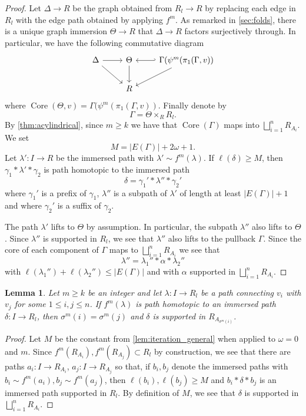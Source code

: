 \documentclass[11pt, a4paper]{amsart}
\newtheorem{lemma}[theorem]{Lemma}
\theoremstyle{definition}
\DeclareMathOperator{\len}{\ell}
\DeclareMathOperator{\core}{Core}
\begin{document}
\begin{proof}
Let $\Delta\to R$ be the graph obtained from $R_l\to R$ by replacing each edge in $R_l$ with the edge path obtained by applying $f^m$. As remarked in \cref{sec:folds}, there is a unique graph immersion $\Theta\to R$ that $\Delta\to R$ factors surjectively through. In particular, we have the following commutative diagram
\[
\begin{tikzcd}
\Delta \arrow[rd] \arrow[r] & \Theta \arrow[d] & {\Gamma(\psi^m(\pi_1(\Gamma, v))} \arrow[l, hook'] \arrow[ld] \\
                            & R                &                                                              
\end{tikzcd}
\]
where $\core(\Theta, v) = \Gamma(\psi^m(\pi_1(\Gamma, v))$. Finally denote by 
\[
\Gamma = \Theta\times_RR_{l}.
\]
By \cref{thm:acylindrical}, since $m\geqslant k$ we have that $\core(\Gamma)$ maps into $\bigsqcup_{i=1}^nR_{A_i}$. We set
\[
M = |E(\Gamma)| + 2\omega + 1.
\]
Let $\lambda'\colon I\to R$ be the immersed path with $\lambda'\sim f^m(\lambda)$. If $\len(\delta)\geqslant M$, then $\gamma_1*\lambda'*\gamma_2$ is path homotopic to the immersed path
\[
\delta = \gamma_1'*\lambda''*\gamma_2'
\]
where $\gamma_1'$ is a prefix of $\gamma_1$, $\lambda''$ is a subpath of $\lambda'$ of length at least $|E(\Gamma)|+1$ and where $\gamma_2'$ is a suffix of $\gamma_2$.

The path $\lambda'$ lifts to $\Theta$ by assumption. In particular, the subpath $\lambda''$ also lifts to $\Theta$. Since $\lambda''$ is supported in $R_{l}$, we see that $\lambda''$ also lifts to the pullback $\Gamma$. Since the core of each component of $\Gamma$ maps to $\bigsqcup_{i=1}^nR_{A_i}$ we see that 
\[
\lambda'' = \lambda_1''*\alpha*\lambda_2''
\]
with $\len(\lambda_1'') + \len(\lambda_2'') \leqslant |E(\Gamma)|$ and with $\alpha$ supported in $\bigsqcup_{i=1}^nR_{A_i}$.
\end{proof}


\begin{lemma}
\label{lem:iteration}
Let $m\geqslant k$ be an integer and let $\lambda\colon I\to R_l$ be a path connecting $v_i$ with $v_j$ for some $1\leqslant i, j\leqslant n$. If $f^m(\lambda)$ is path homotopic to an immersed path $\delta\colon I \to R_l$, then $\sigma^m(i) = \sigma^m(j)$ and $\delta$ is supported in $R_{A_{\sigma^m(i)}}$. 
\end{lemma}

\begin{proof}
Let $M$ be the constant from \cref{lem:iteration_general} when applied to $\omega = 0$ and $m$. Since $f^m(R_{A_i}), f^m(R_{A_j})\subset R_l$ by construction, we see that there are paths $a_i\colon I\to R_{A_i}$, $a_j\colon I\to R_{A_j}$ so that, if $b_i, b_j$ denote the immersed paths with $b_i\sim f^m(a_i), b_j\sim f^m(a_j)$, then $\len(b_i), \len(b_j)\geqslant M$ and $b_i*\delta*b_j$ is an immersed path supported in $R_l$. By definition of $M$, we see that $\delta$ is supported in $\bigsqcup_{i=1}^nR_{A_i}$.
\end{proof}
\end{document}
